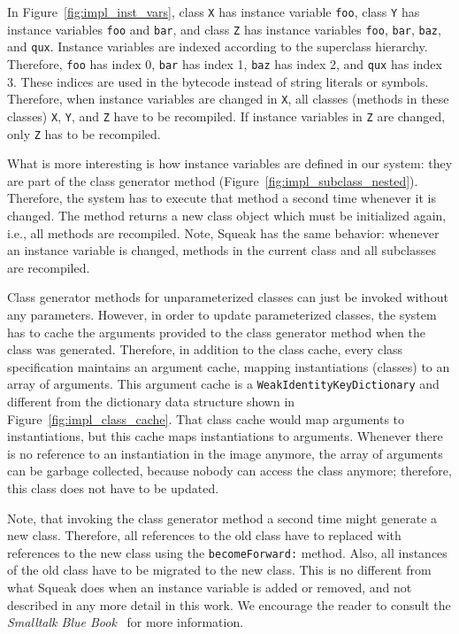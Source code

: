 In Figure~\ref{fig:impl_inst_vars}, class \texttt{X} has instance variable \texttt{foo}, class \texttt{Y} has instance variables \texttt{foo} and \texttt{bar}, and class \texttt{Z} has instance variables \texttt{foo}, \texttt{bar}, \texttt{baz}, and \texttt{qux}. Instance variables are indexed according to the superclass hierarchy. Therefore, \texttt{foo} has index 0, \texttt{bar} has index 1, \texttt{baz} has index 2, and \texttt{qux} has index 3. These indices are used in the bytecode instead of string literals or symbols. Therefore, when instance variables are changed in \texttt{X}, all classes (methods in these classes) \texttt{X}, \texttt{Y}, and \texttt{Z} have to be recompiled. If instance variables in \texttt{Z} are changed, only \texttt{Z} has to be recompiled.

What is more interesting is how instance variables are defined in our system: they are part of the class generator method (Figure~\ref{fig:impl_subclass_nested}). Therefore, the system has to execute that method a second time whenever it is changed. The method returns a new class object which must be initialized again, i.e., all methods are recompiled. Note, Squeak has the same behavior: whenever an instance variable is changed, methods in the current class and all subclasses are recompiled. 

Class generator methods for unparameterized classes can just be invoked without any parameters. However, in order to update parameterized classes, the system has to cache the arguments provided to the class generator method when the class was generated. Therefore, in addition to the class cache, every class specification maintains an argument cache, mapping instantiations (classes) to an array of arguments. This argument cache is a \texttt{WeakIdentityKeyDictionary} and different from the dictionary data structure shown in Figure~\ref{fig:impl_class_cache}. That class cache would map arguments to instantiations, but this cache maps instantiations to arguments. Whenever there is no reference to an instantiation in the image anymore, the array of arguments can be garbage collected, because nobody can access the class anymore; therefore, this class does not have to be updated.

Note, that invoking the class generator method a second time might generate a new class. Therefore, all references to the old class have to replaced with references to the new class using the \texttt{becomeForward:} method. Also, all instances of the old class have to be migrated to the new class. This is no different from what Squeak does when an instance variable is added or removed, and not described in any more detail in this work. We encourage the reader to consult the \emph{Smalltalk Blue Book}~\cite{Goldberg:1983:SLI:273} for more information.

